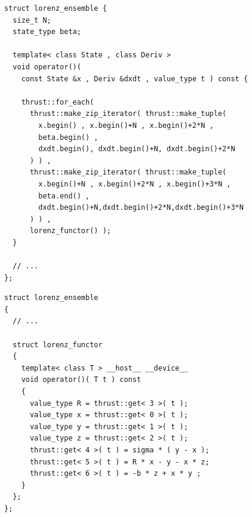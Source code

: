 \begin{frame}[fragile]


 \begin{lstlisting}[basicstyle=\scriptsize\ttfamily]
struct lorenz_ensemble {
  size_t N;
  state_type beta;

  template< class State , class Deriv >
  void operator()(
    const State &x , Deriv &dxdt , value_type t ) const {
  
    thrust::for_each(
      thrust::make_zip_iterator( thrust::make_tuple(
        x.begin() , x.begin()+N , x.begin()+2*N ,
        beta.begin() ,
        dxdt.begin(), dxdt.begin()+N, dxdt.begin()+2*N
      ) ) ,
      thrust::make_zip_iterator( thrust::make_tuple(
        x.begin()+N , x.begin()+2*N , x.begin()+3*N ,
        beta.end() ,
        dxdt.begin()+N,dxdt.begin()+2*N,dxdt.begin()+3*N
      ) ) ,
      lorenz_functor() );
  }

  // ...
};
 \end{lstlisting}


\end{frame}


\begin{frame}[fragile]


 \begin{lstlisting}[basicstyle=\scriptsize\ttfamily]
struct lorenz_ensemble
{
  // ...

  struct lorenz_functor
  {
    template< class T > __host__ __device__
    void operator()( T t ) const
    {
      value_type R = thrust::get< 3 >( t );
      value_type x = thrust::get< 0 >( t );
      value_type y = thrust::get< 1 >( t );
      value_type z = thrust::get< 2 >( t );
      thrust::get< 4 >( t ) = sigma * ( y - x );
      thrust::get< 5 >( t ) = R * x - y - x * z;
      thrust::get< 6 >( t ) = -b * z + x * y ;
    }
  };
};
 \end{lstlisting}


\end{frame}




